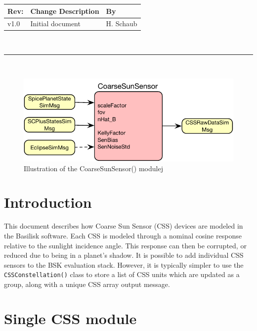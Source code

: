 \documentclass[]{BasiliskReportMemo}
\begin{document}
\makeCover


%
%
\pagestyle{empty}
{\renewcommand{\arraystretch}{1.1}
\noindent
\begin{longtable}{|p{0.5in}|p{4.5in}|p{1.14in}|}
\hline
{\bfseries Rev}: & {\bfseries Change Description} & {\bfseries By} \\
\hline
v1.0 & Initial document & H. Schaub \\
\hline

\end{longtable}
}

\newpage
\setcounter{page}{1}
\pagestyle{fancy}

\tableofcontents
~\\ \hrule ~\\


\begin{figure}[htb]
	\centerline{
	\includegraphics[]{Figures/moduleDiagram}
	}
	\caption{Illustration of the CoarseSunSensor() modulej}
	\label{fig:moduleDiagram}
\end{figure}
\section{Introduction}
This document describes how Coarse Sun Sensor (CSS) devices are modeled in the Basilisk software.  Each CSS is modeled through a nominal cosine response relative to the sunlight incidence angle.  This response can then be corrupted, or reduced due to being in a planet's shadow.  It is possible to add individual CSS sensors to the BSK evaluation stack.  However, it is typically simpler to use the {\tt CSSConstellation()} class to store a list of CSS units which are updated as a group, along with a unique CSS array output message.

\section{Single CSS module}
\end{document}
